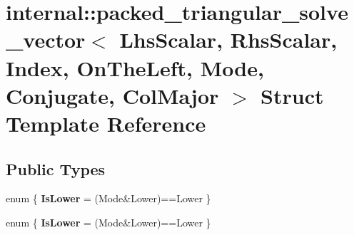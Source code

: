 \hypertarget{structinternal_1_1packed__triangular__solve__vector_3_01_lhs_scalar_00_01_rhs_scalar_00_01_index28b9bd679eec74694b1e600413bff835}{}\section{internal\+:\+:packed\+\_\+triangular\+\_\+solve\+\_\+vector$<$ Lhs\+Scalar, Rhs\+Scalar, Index, On\+The\+Left, Mode, Conjugate, Col\+Major $>$ Struct Template Reference}
\label{structinternal_1_1packed__triangular__solve__vector_3_01_lhs_scalar_00_01_rhs_scalar_00_01_index28b9bd679eec74694b1e600413bff835}
\subsection*{Public Types}
\begin{DoxyCompactItemize}
\item 
\mbox{\label{structinternal_1_1packed__triangular__solve__vector_3_01_lhs_scalar_00_01_rhs_scalar_00_01_index28b9bd679eec74694b1e600413bff835_afe99908d2daa4e486021e4b3c8da9f3c}} 
enum \{ {\bfseries Is\+Lower} = (Mode\&Lower)==Lower
 \}
\item 
\mbox{\label{structinternal_1_1packed__triangular__solve__vector_3_01_lhs_scalar_00_01_rhs_scalar_00_01_index28b9bd679eec74694b1e600413bff835_af68822103d086de6667818059158f9cc}} 
enum \{ {\bfseries Is\+Lower} = (Mode\&Lower)==Lower
 \}
\end{DoxyCompactItemize}
